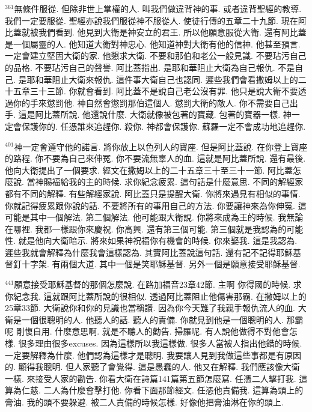\documentclass{book}
\begin{document}
$^{361}$無條件服從.
但除非世上掌權的人.
叫我們做違背神的事.
或者違背聖經的教導.
我們一定要服從.
聖經亦說我們服從神不服從人.
使徒行傳的五章二十九節.
現在阿比蓋就被我們看到.
他見到大衛是神安立的君王.
所以他願意服從大衛.
還有阿比蓋是一個屬靈的人.
他知道大衛對神忠心.
他知道神對大衛有他的信神.
他甚至預言.
一定會建立堅固大衛的家.
他懇求大衛.
不要和那伯和老公一般見識.
不要玷污自己的品格.
不要玷污自己的聲譽.
阿比蓋指出.
是耶和華阻止大衛為自己報仇.
不是自己.
是耶和華阻止大衛來報仇.
這件事大衛自己也認同.
遲些我們會看撒姆以上的二十五章三十三節.
你就會看到.
阿比蓋不是說自己老公沒有罪.
他只是說大衛不要透過你的手來懲罰他.
神自然會懲罰那伯這個人.
懲罰大衛的敵人.
你不需要自己出手.
這是阿比蓋所說.
他還說什麼.
大衛就像被包著的寶藏.
包著的寶器一樣.
神一定會保護你的.
任憑誰來追趕你.
殺你.
神都會保護你.
蘇羅一定不會成功地追趕你.

$^{401}$神一定會遵守他的諾言.
將你放上以色列人的寶座.
但是阿比蓋說.
在你登上寶座的路程.
你不要為自己來伸冤.
你不要流無辜人的血.
這就是阿比蓋所說.
還有最後.
他向大衛提出了一個要求.
經文在撒姆以上的二十五章三十至三十一節.
阿比蓋怎麼說.
當神賜福給我的主的時候.
求你紀念疲累.
這句話是什麼意思.
不同的解經家都有不同的解釋.
有些解經家說.
阿比蓋只是提醒大衛.
你將來遇見有相似的事情.
你就記得疲累跟你說的話.
不要將所有的事用自己的方法.
你要讓神來為你伸冤.
這可能是其中一個解法.
第二個解法.
他可能跟大衛說.
你將來成為王的時候.
我無論在哪裡.
我都一樣跟你來慶祝.
你高興.
還有第三個可能.
第三個就是我認為的可能性.
就是他向大衛暗示.
將來如果神祝福你有機會的時候.
你來娶我.
這是我認為.
遲些我就會解釋為什麼我會這樣認為.
其實阿比蓋說這句話.
還有記不記得耶穌基督釘十字架.
有兩個大道.
其中一個是笑耶穌基督.
另外一個是願意接受耶穌基督.

$^{441}$願意接受耶穌基督的那個怎麼說.
在路加福音23章42節.
主啊 你得國的時候.
求你紀念我.
這就跟阿比蓋所說的很相似.
透過阿比蓋阻止他傷害那霸.
在撒姆以上的25章33節.
大衛說你和你的見識也當稱讚.
因為你今天難了我親手報仇流人的血.
大衛是一個很聰明的人.
他聽人的話.
聽人的責備.
你就見到他是一個聰明的人.
那霸呢 剛愎自用.
什麼意思啊.
就是不聽人的勸告.
掃羅呢.
有人說他做得不對他會怎樣.
很多理由很多excuses.
因為這樣所以我這樣做.
很多人當被人指出他錯的時候.
一定要解釋為什麼.
他們認為這樣才是聰明.
我要讓人見到我做這些事都是有原因的.
顯得我聰明.
但人家聽了會覺得.
這是愚蠢的人.
他又在解釋.
我們應該像大衛一樣.
來接受人家的勸告.
你看大衛在詩篇141篇第五節怎麼寫.
任憑二人擊打我.
這算為仁慈.
二人為什麼會擊打他.
你看下面那節經文.
任憑他責備我.
這算為頭上的膏油.
我的頭不要躲避.
被二人責備的時候怎樣.
好像他把膏油淋在你的頭上.
\end{document}
